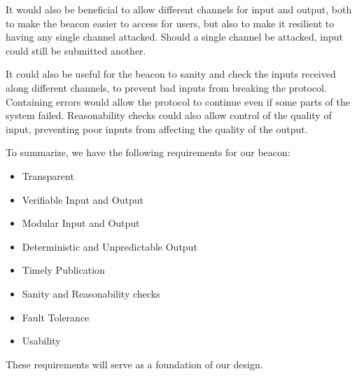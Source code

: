 It would also be beneficial to allow different channels for input and output, both to make the beacon easier to access for users, but also to make it resilient to having any single channel attacked. Should a single channel be attacked, input could still be submitted another.

It could also be useful for the beacon to sanity and check the inputs received along different channels, to prevent bad inputs from breaking the protocol. Containing errors would allow the protocol to continue even if some parts of the system failed.
Reasonability checks could also allow control of the quality of input, preventing poor inputs from affecting the quality of the output.

To summarize, we have the following requirements for our beacon:

\begin{itemize}
    \item Transparent
    \item Verifiable Input and Output
    \item Modular Input and Output
    \item Deterministic and Unpredictable Output
    \item Timely Publication
    \item Sanity and Reasonability checks
    \item Fault Tolerance
    \item Usability
\end{itemize}

These requirements will serve as a foundation of our design.